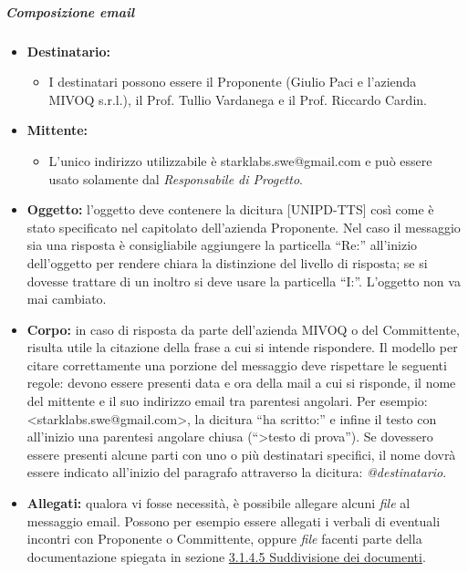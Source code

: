 \subparagraph{Composizione email}
\begin{itemize}
\item \textbf{Destinatario:}
\begin{itemize}
\item I destinatari possono essere il Proponente (Giulio Paci e l'azienda MIVOQ s.r.l.), il Prof. Tullio Vardanega e il Prof. Riccardo Cardin.
\end{itemize}
\item \textbf{Mittente:}
\begin{itemize}
\item L'unico indirizzo utilizzabile è starklabs.swe@gmail.com e può essere usato solamente dal \textit{Responsabile di Progetto}.
\end{itemize}

\item \textbf{Oggetto:} l'oggetto deve contenere la dicitura [UNIPD-TTS] così come è stato specificato nel capitolato dell'azienda Proponente. Nel caso il messaggio sia una risposta è consigliabile aggiungere la particella “Re:” all'inizio dell'oggetto per rendere chiara la distinzione del livello di risposta; se si dovesse trattare di un inoltro si deve usare la particella “I:”. L'oggetto non va mai cambiato.

\item \textbf{Corpo:} in caso di risposta da parte dell'azienda MIVOQ o del Committente,
risulta utile la citazione della frase a cui si intende rispondere. Il modello per citare correttamente una porzione del messaggio deve rispettare le seguenti regole: devono essere presenti data e ora della mail a cui si risponde, il nome del mittente e il suo 
indirizzo email tra parentesi angolari. Per esempio: <starklabs.swe@gmail.com>, 
la dicitura “ha scritto:” e infine il testo con all'inizio una parentesi angolare chiusa (“>testo di prova”). 
Se dovessero essere presenti alcune parti con uno o 
più destinatari specifici, il nome dovrà essere indicato all'inizio del paragrafo attraverso la dicitura: \textit{@destinatario}.

\item \textbf{Allegati:} qualora vi fosse necessità, è possibile allegare alcuni \textit{file} al 
messaggio email. Possono per esempio essere allegati i verbali di eventuali incontri con 
Proponente o Committente, oppure \textit{file} facenti parte della documentazione spiegata in sezione \hyperref[sec:suddivisioneDocumenti]{3.1.4.5 Suddivisione dei documenti}.
\end{itemize}


